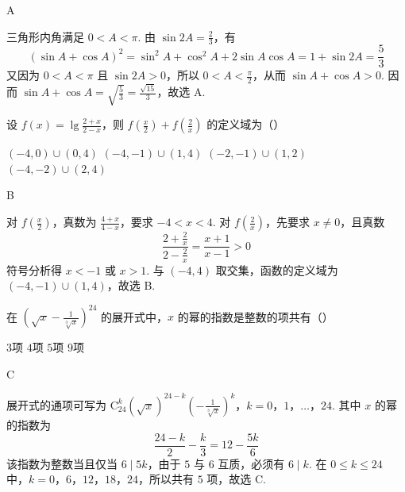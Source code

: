 \begin{answer}
A
\end{answer}

\begin{solution}
三角形内角满足 \(0<A<\pi\). 由 \(\sin 2A=\frac{2}{3}\)，有
\[
(\sin A+\cos A)^{2}=\sin^{2}A+\cos^{2}A+2\sin A\cos A=1+\sin 2A=\frac{5}{3}
\]
又因为 \(0<A<\pi\) 且 \(\sin 2A>0\)，所以 \(0<A<\frac{\pi}{2}\)，从而 \(\sin A+\cos A>0\). 因而 \(\sin A+\cos A=\sqrt{\frac{5}{3}}=\frac{\sqrt{15}}{3}\)，故选 A.
\end{solution}

\begin{problem}
设 \(f(x) = \lg \frac{2 + x}{2 - x}\)，则 \(f\left(\frac{x}{2}\right) + f\left(\frac{2}{x}\right)\) 的定义域为（\quad）

\choices
    {\((-4,0)\cup(0,4)\)}
    {\((-4,-1)\cup(1,4)\)}
    {\((-2,-1)\cup(1,2)\)}
    {\((-4,-2)\cup(2,4)\)}
\end{problem}

\begin{answer}
B
\end{answer}

\begin{solution}
对 \(f\left(\frac{x}{2}\right)\)，真数为 \(\frac{4+x}{4-x}\)，要求 \(-4<x<4\). 对 \(f\left(\frac{2}{x}\right)\)，先要求 \(x\ne0\)，且真数
\[
\frac{2+\frac{2}{x}}{2-\frac{2}{x}}=\frac{x+1}{x-1}>0
\]
符号分析得 \(x<-1\) 或 \(x>1\). 与 \((-4,4)\) 取交集，函数的定义域为 \((-4,-1)\cup(1,4)\)，故选 B.
\end{solution}

\begin{problem}
在 \(\left(\sqrt{x} - \frac{1}{\sqrt[3]{x}}\right)^{24}\) 的展开式中，\(x\) 的幂的指数是整数的项共有（\quad）

\choices
    {\(3\)项}
    {\(4\)项}
    {\(5\)项}
    {\(9\)项}
\end{problem}

\begin{answer}
C
\end{answer}

\begin{solution}
展开式的通项可写为
\(\mathrm C_{24}^{k}(\sqrt{x})^{24-k}\left(-\frac{1}{\sqrt[3]{x}}\right)^{k}\)，\(k=0\)，\(1\)，\(\ldots\)，\(24\).
其中 \(x\) 的幂的指数为
\[
\frac{24-k}{2}-\frac{k}{3}=12-\frac{5k}{6}
\]
该指数为整数当且仅当 \(6\mid 5k\)，由于 \(5\) 与 \(6\) 互质，必须有 \(6\mid k\). 在 \(0\leqslant k\leqslant24\) 中，\(k=0\)，\(6\)，\(12\)，\(18\)，\(24\)，所以共有 \(5\) 项，故选 C.
\end{solution}


